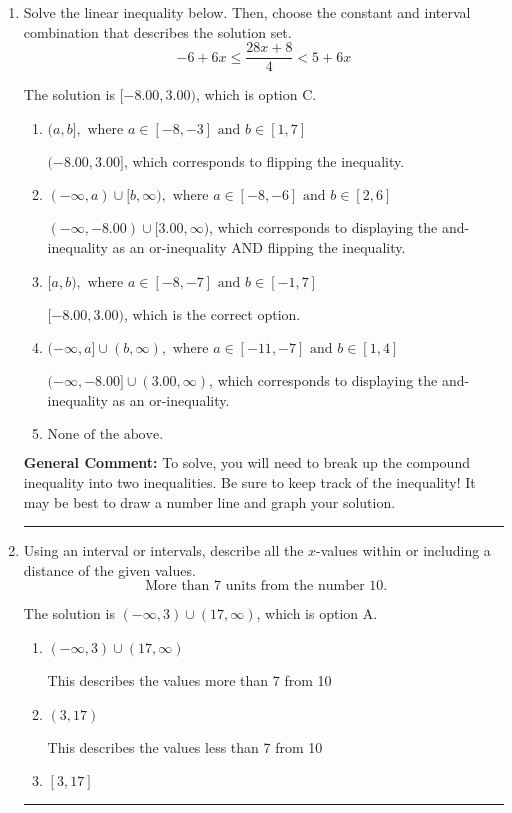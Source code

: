 \documentclass{extbook}[14pt]
\newcommand{\litem}[1]{\item #1

\rule{\textwidth}{0.4pt}}
\begin{document}
\begin{enumerate}
{\textbf{General Comment:} When multiplying or dividing by a negative, flip the sign.
}
\litem{
Solve the linear inequality below. Then, choose the constant and interval combination that describes the solution set.
\[ -6 + 6 x \leq \frac{28 x + 8}{4} < 5 + 6 x \]

The solution is \( [-8.00, 3.00) \), which is option C.\begin{enumerate}[label=\Alph*.]
\item \( (a, b], \text{ where } a \in [-8, -3] \text{ and } b \in [1, 7] \)

$(-8.00, 3.00]$, which corresponds to flipping the inequality.
\item \( (-\infty, a) \cup [b, \infty), \text{ where } a \in [-8, -6] \text{ and } b \in [2, 6] \)

$(-\infty, -8.00) \cup [3.00, \infty)$, which corresponds to displaying the and-inequality as an or-inequality AND flipping the inequality.
\item \( [a, b), \text{ where } a \in [-8, -7] \text{ and } b \in [-1, 7] \)

$[-8.00, 3.00)$, which is the correct option.
\item \( (-\infty, a] \cup (b, \infty), \text{ where } a \in [-11, -7] \text{ and } b \in [1, 4] \)

$(-\infty, -8.00] \cup (3.00, \infty)$, which corresponds to displaying the and-inequality as an or-inequality.
\item \( \text{None of the above.} \)


\end{enumerate}

\textbf{General Comment:} To solve, you will need to break up the compound inequality into two inequalities. Be sure to keep track of the inequality! It may be best to draw a number line and graph your solution.
}
\litem{
Using an interval or intervals, describe all the $x$-values within or including a distance of the given values.
\[ \text{ More than } 7 \text{ units from the number } 10. \]

The solution is \( (-\infty, 3) \cup (17, \infty) \), which is option A.\begin{enumerate}[label=\Alph*.]
\item \( (-\infty, 3) \cup (17, \infty) \)

This describes the values more than 7 from 10
\item \( (3, 17) \)

This describes the values less than 7 from 10
\item \( [3, 17] \)


\end{enumerate}}
\end{enumerate}
\end{document}
